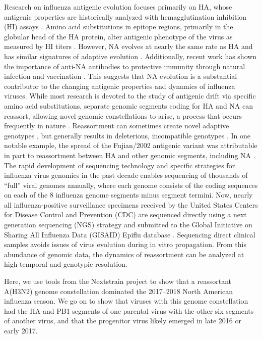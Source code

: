 Research on influenza antigenic evolution focuses primarily on HA, whose antigenic properties are historically analyzed with hemagglutination inhibition (HI) assays \citep{hirst_quantitative_1942}.
Amino acid substitutions in epitope regions, primarily in the globular head of the HA protein, alter antigenic phenotype of the virus as measured by HI titers \citep{smith_mapping_2004, koel_substitutions_2013, bedford_integrating_2014, neher_prediction_2016}.
However, NA evolves at nearly the same rate as HA and has similar signatures of adaptive evolution \citep{bhatt_genomic_2011}.
Additionally, recent work has shown the importance of anti-NA antibodies to protective immunity through natural infection and vaccination \citep{monto_antibody_2015, huang_risk_2018}.
This suggests that NA evolution is a substantial contributor to the changing antigenic properties and dynamics of influenza viruses.
While most research is devoted to the study of antigenic drift via specific amino acid substitutions, separate genomic segments coding for HA and NA can reassort, allowing novel genomic constellations to arise, a process that occurs frequently in nature \citep{nelson_multiple_2008, marshall_influenza_2013}.
Reassortment can sometimes create novel adaptive genotypes \citep{neverov_intrasubtype_2014, dudas_reassortment_2015}, but generally results in deleterious, incompatible genotypes \citep{rabadan_non-random_2008, villa_fitness_2017}.
In one notable example, the spread of the Fujian/2002 antigenic variant was attributable in part to reassortment between HA and other genomic segments, including NA \citep{holmes_whole_2005}.
The rapid development of sequencing technology and specific strategies for influenza virus genomics in the past decade enables sequencing of thousands of “full” viral genomes annually, where each genome consists of the coding sequences on each of the 8 influenza genome segments minus segment termini.
Now, nearly all influenza-positive surveillance specimens received by the United States Centers for Disease Control and Prevention (CDC) are sequenced directly using a next generation sequencing (NGS) strategy and submitted to the Global Initiative on Sharing All Influenza Data (GISAID) Epiflu database \citep{elbe2017data}.
Sequencing direct clinical samples avoids issues of virus evolution during in vitro propagation.
From this abundance of genomic data, the dynamics of reassortment can be analyzed at high temporal and genotypic resolution.

Here, we use tools from the Nextstrain project \citep{hadfield_nextstrain_2018} to show that a reassortant A(H3N2) genome constellation dominated the 2017–2018 North American influenza season.
We go on to show that viruses with this genome constellation had the HA and PB1 segments of one parental virus with the other six segments of another virus, and that the progenitor virus likely emerged in late 2016 or early 2017.

